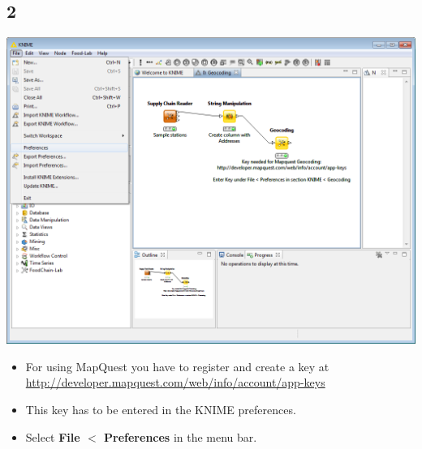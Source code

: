 \documentclass{beamer}
\begin{document}
\subsection{2}
\begin{frame}
	\begin{center}
  		\includegraphics[height=0.6\textheight]{2.png}
	\end{center}
	\begin{itemize}		
		\item For using MapQuest you have to register and create a key at \url{http://developer.mapquest.com/web/info/account/app-keys}
		\item This key has to be entered in the KNIME preferences.
		\item Select \textbf{File $<$ Preferences} in the menu bar.
	\end{itemize}
\end{frame}
\end{document}
